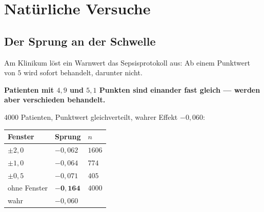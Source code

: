 \chapter{Natürliche Versuche}

\section{Der Sprung an der Schwelle}

\begin{merksatz}
Am Klinikum löst ein Warnwert das Sepsisprotokoll aus: Ab einem Punktwert von $5$ wird sofort behandelt, darunter nicht.

\begin{center}
\begin{minipage}{0.9\textwidth}
\textbf{Patienten mit $4{,}9$ und $5{,}1$ Punkten sind einander fast gleich --- werden aber verschieden behandelt.}
\end{minipage}
\end{center}

\begin{center}
\begin{minipage}{0.88\textwidth}
\end{minipage}
\end{center}

$4000$ Patienten, Punktwert gleichverteilt, wahrer Effekt $-0{,}060$:

\begin{center}
{\small
\renewcommand{\arraystretch}{1.48}
\begin{tabular}{@{}P{2.4cm}P{2.2cm}P{2.2cm}@{}}
\toprule
\textbf{Fenster} & \textbf{Sprung} & $n$\\
\midrule
$\pm2{,}0$ & $-0{,}062$ & $1606$\\
$\pm1{,}0$ & $-0{,}064$ & $774$\\
$\pm0{,}5$ & $-0{,}071$ & $405$\\
\midrule
ohne Fenster & $\mathbf{-0{,}164}$ & $4000$\\
\midrule
wahr & $-0{,}060$ & \\
\bottomrule
\end{tabular}}
\end{center}


\end{merksatz}
